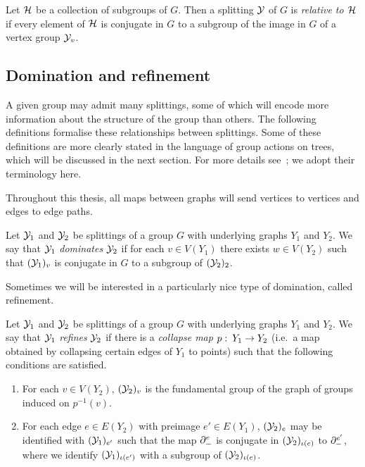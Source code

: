 \begin{definition}
  Let $\mathcal{H}$ be a collection of subgroups of $G$.
  Then a splitting $\mathcal{Y}$ of $G$ is \emph{relative to $\mathcal{H}$} if every element of $\mathcal{H}$ is conjugate in $G$ to a subgroup of the image in $G$ of a vertex group $\mathcal{Y}_v$.
\end{definition}

\subsection{Domination and refinement}\label{section:domination_refinement}

A given group may admit many splittings, some of which will encode more information about the structure of the group than others. 
The following definitions formalise these relationships between splittings.
Some of these definitions are more clearly stated in the language of group actions on trees, which will be discussed in the next section.
For more details see~\cite{guirardellevitt17}; we adopt their terminology here.

Throughout this thesis, all maps between graphs will send vertices to vertices and edges to edge paths.

\begin{definition}
  Let $\mathcal{Y}_1$ and $\mathcal{Y}_2$ be splittings of a group $G$ with underlying graphs $Y_1$ and $Y_2$.
  We say that $\mathcal{Y}_1$ \emph{dominates} $\mathcal{Y}_2$ if for each $v \in V(Y_1)$ there exists $w \in V(Y_2)$ such that $(\mathcal{Y}_1)_v$ is conjugate in $G$ to a subgroup of $(\mathcal{Y}_2)_2$.
\end{definition}

Sometimes we will be interested in a particularly nice type of domination, called refinement.

\begin{definition}
  Let $\mathcal{Y}_1$ and $\mathcal{Y}_2$ be splittings of a group $G$ with underlying graphs $Y_1$ and $Y_2$.
  We say that $\mathcal{Y}_1$ \emph{refines} $\mathcal{Y}_2$ if there is a \emph{collapse map} $p\operatorname{\colon} Y_1 \to Y_2$ (i.e.\ a map obtained by collapsing certain edges of $Y_1$ to points) such that the following conditions are satisfied.
  \begin{enumerate}
    \item For each $v \in V(Y_2)$, $(\mathcal{Y}_2)_v$ is the fundamental group of the graph of groups induced on $p^{-1}(v)$.
    \item For each edge $e \in E(Y_2)$ with preimage $e' \in E(Y_1)$, $(\mathcal{Y}_2)_e$ may be identified with $(\mathcal{Y}_1)_{e'}$ such that the map $\partial^{e}_{-}$ is conjugate in $(\mathcal{Y}_2)_{\operatorname{\iota}(e)}$ to $\partial^{e'}_{-}$, where we identify $(\mathcal{Y}_1)_{\operatorname{\iota}(e')}$ with a subgroup of $(\mathcal{Y}_2)_{\operatorname{\iota}(e)}$.
  \end{enumerate} 
\end{definition}

